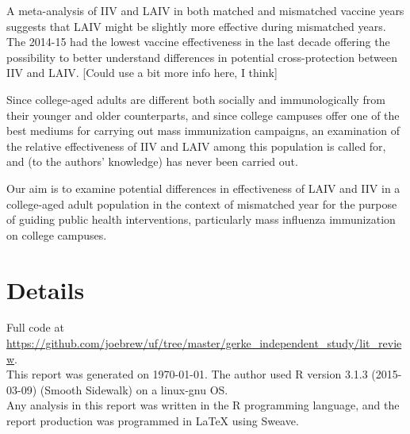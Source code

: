 \documentclass[11pt]{article}
\begin{document}
\begin{multicols}{2}
A meta-analysis of IIV and LAIV in both matched and mismatched vaccine years suggests that LAIV might be slightly more effective during mismatched years. \cite{Tricco2013} The 2014-15 had the lowest vaccine effectiveness in the last decade offering the possibility to better understand differences in potential cross-protection between IIV and LAIV.  [Could use a bit more info here, I think]  

Since college-aged adults are different both socially and immunologically from their younger and older counterparts, and since college campuses offer one of the best mediums for carrying out mass immunization campaigns, an examination of the relative effectiveness of IIV and LAIV among this population is called for, and (to the authors' knowledge) has never been carried out.  

Our aim is to examine potential differences in effectiveness of LAIV and IIV in a college-aged adult population in the context of mismatched year for the purpose of guiding public health interventions, particularly mass influenza immunization on college campuses.









\end{multicols}
\newpage
{}



\newpage
\section*{Details}
\hrulefill

\vspace{10mm}
Full code at \href{https://github.com/joebrew/uf/tree/master/gerke\_independent\_study/lit\_review}{https://github.com/joebrew/uf/tree/master/gerke\_independent\_study/lit\_review}. \\

This report was generated on \today.  The author used R version 3.1.3 (2015-03-09) (Smooth Sidewalk) on a linux-gnu OS.  \\

Any analysis in this report was written in the R programming language, and the report production was programmed in \LaTeX{} using Sweave.\\
\end{document}

